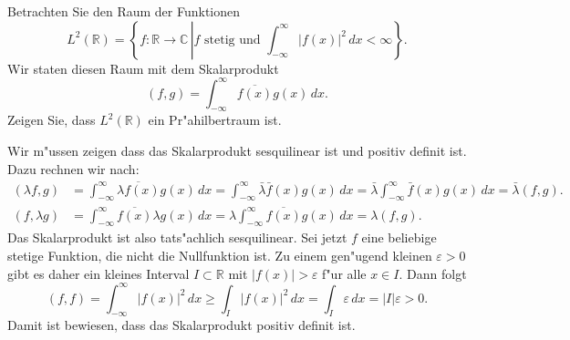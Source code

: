 Betrachten Sie den Raum der Funktionen
\[
L^2(\mathbb R)=\left\{
f:\mathbb R\to\mathbb C\,\left|
\text{$f$ stetig und }
\int_{-\infty}^\infty |f(x)|^2\,dx<\infty
\right.
\right\}.
\]
Wir staten diesen Raum mit dem Skalarprodukt
\[
(f,g)=\int_{-\infty}^\infty \overline{f(x)}g(x)\,dx.
\]
Zeigen Sie, dass $L^2(\mathbb R)$ ein Pr"ahilbertraum ist.

\begin{loesung}
Wir m"ussen zeigen dass das Skalarprodukt sesquilinear ist und positiv
definit ist.
Dazu rechnen wir nach:
\begin{align*}
(\lambda f,g)
&=
\int_{-\infty}^\infty
\overline{\lambda f(x)}g(x)
\,dx
=
\int_{-\infty}^\infty
\bar \lambda \bar f(x)
g(x)
\,dx
=
\bar \lambda
\int_{-\infty}^\infty
\bar f(x) g(x)
\,dx
=\bar\lambda(f,g).
\\
(f,\lambda g)
&=
\int_{-\infty}^\infty
\overline{f(x)}\lambda g(x)
\,dx
=
\lambda
\int_{-\infty}^\infty
\overline{f(x)}g(x)
\,dx
=
\lambda(f,g).
\end{align*}
Das Skalarprodukt ist also tats"achlich sesquilinear.
Sei jetzt $f$ eine beliebige stetige Funktion, die nicht die Nullfunktion
ist. Zu einem gen"ugend kleinen $\varepsilon>0$ gibt es daher ein kleines
Interval $I\subset\mathbb R$ mit $|f(x)|>\varepsilon$ f"ur alle $x\in I$.
Dann folgt
\[
(f,f)
=
\int_{-\infty}^\infty
|f(x)|^2
\,dx
\ge
\int_I|f(x)|^2\,dx
=
\int_I\varepsilon\,dx
=|I|\varepsilon >0.
\]
Damit ist bewiesen, dass das Skalarprodukt positiv definit ist.
\end{loesung}

